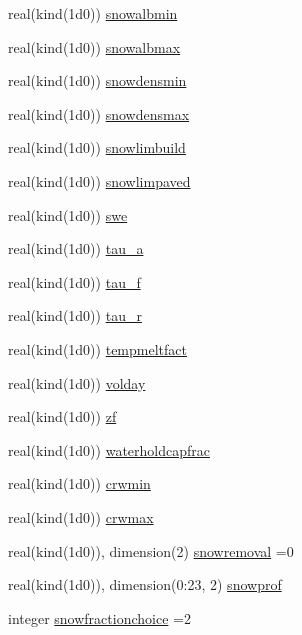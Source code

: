 \begin{DoxyCompactItemize}
real(kind(1d0)) \hyperlink{namespacesnowmod_a96e2ce7900b7310542876993d72547ef}{snowalbmin}
\item 
real(kind(1d0)) \hyperlink{namespacesnowmod_abce33f4b342130e8ac52ef51369bc801}{snowalbmax}
\item 
real(kind(1d0)) \hyperlink{namespacesnowmod_a4b6de2a8e2186c8f314bbbfe6e78d345}{snowdensmin}
\item 
real(kind(1d0)) \hyperlink{namespacesnowmod_a8a8b8429973d4227f3f1af64ebce2e79}{snowdensmax}
\item 
real(kind(1d0)) \hyperlink{namespacesnowmod_a0462c0f187d9c6a590598f728f776991}{snowlimbuild}
\item 
real(kind(1d0)) \hyperlink{namespacesnowmod_a7e327a63642bd081c76b33340881ae7b}{snowlimpaved}
\item 
real(kind(1d0)) \hyperlink{namespacesnowmod_a216f7ed83c0474b708443eddfa6c574e}{swe}
\item 
real(kind(1d0)) \hyperlink{namespacesnowmod_a98e11e8fda25e951b1c7a65ec1d36e9f}{tau\+\_\+a}
\item 
real(kind(1d0)) \hyperlink{namespacesnowmod_adcf5755398c1385d35ef29e6f780ff9c}{tau\+\_\+f}
\item 
real(kind(1d0)) \hyperlink{namespacesnowmod_aaf08f7c00b0d87b2135341ca3f63f0d7}{tau\+\_\+r}
\item 
real(kind(1d0)) \hyperlink{namespacesnowmod_a963e4ef23aef666f3afb12096ef952b8}{tempmeltfact}
\item 
real(kind(1d0)) \hyperlink{namespacesnowmod_aef00a57fa640ad627fb60de11644e20d}{volday}
\item 
real(kind(1d0)) \hyperlink{namespacesnowmod_ab1cf232aa719c4c447ac11c210889e66}{zf}
\item 
real(kind(1d0)) \hyperlink{namespacesnowmod_a8cda7b30a924d03ee30f2bde6c9e41bc}{waterholdcapfrac}
\item 
real(kind(1d0)) \hyperlink{namespacesnowmod_ab2e9b89164bc8dd89eadb546e3ef57fa}{crwmin}
\item 
real(kind(1d0)) \hyperlink{namespacesnowmod_adec694ca0cbc2092f2c5d16238b4d0a9}{crwmax}
\item 
real(kind(1d0)), dimension(2) \hyperlink{namespacesnowmod_a9c7d574d109596d16542b38123065e66}{snowremoval} =0
\item 
real(kind(1d0)), dimension(0\+:23, 2) \hyperlink{namespacesnowmod_a1c6363fdf19c43957a62d24fa22ea25e}{snowprof}
\item 
integer \hyperlink{namespacesnowmod_afb1d5c1c466c1cb87fcf8548322581a1}{snowfractionchoice} =2
\end{DoxyCompactItemize}


